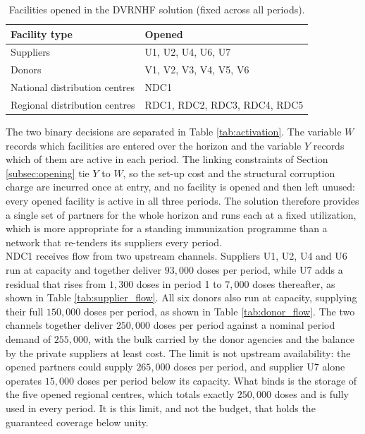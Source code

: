 \documentclass[a4paper]{elsarticle}
\begin{document}
{\begin{table}[htbp]
\centering
\caption{Facilities opened in the DVRNHF solution (fixed across all periods).}
\label{tab:of}
\begin{tabular}{ll}
\toprule
Facility type & Opened \\
\midrule
Suppliers                     & U1, U2, U4, U6, U7 \\
Donors                        & V1, V2, V3, V4, V5, V6 \\
National distribution centres & NDC1 \\
Regional distribution centres & RDC1, RDC2, RDC3, RDC4, RDC5 \\
\bottomrule
\end{tabular}
\end{table}
The two binary decisions are separated in Table \ref{tab:activation}. The variable $W$ records which facilities are entered over the horizon and the variable $Y$ records which of them are active in each period. The linking constraints of Section \ref{subsec:opening} tie $Y$ to $W$, so the set-up cost and the structural corruption charge are incurred once at entry, and no facility is opened and then left unused: every opened facility is active in all three periods. The solution therefore provides a single set of partners for the whole horizon and runs each at a fixed utilization, which is more appropriate for a standing immunization programme than a network that re-tenders its suppliers every period.\\
NDC1 receives flow from two upstream channels. Suppliers U1, U2, U4 and U6 run at capacity and together deliver $93,000$ doses per period, while U7 adds a residual that rises from $1,300$ doses in period 1 to $7,000$ doses thereafter, as shown in Table \ref{tab:supplier_flow}. All six donors also run at capacity, supplying their full $150,000$ doses per period, as shown in Table \ref{tab:donor_flow}. The two channels together deliver $250,000$ doses per period against a nominal period demand of $255,000$, with the bulk carried by the donor agencies and the balance by the private suppliers at least cost. The limit is not upstream availability: the opened partners could supply $265,000$ doses per period, and supplier U7 alone operates $15,000$ doses per period below its capacity. What binds is the storage of the five opened regional centres, which totals exactly $250,000$ doses and is fully used in every period. It is this limit, and not the budget, that holds the guaranteed coverage below unity.\\
}
\end{document}
